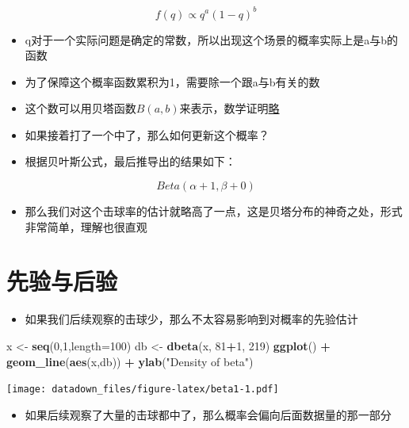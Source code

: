 \documentclass[]{book}
\newenvironment{Shaded}{\begin{snugshade}}{\end{snugshade}}
\newcommand{\DataTypeTok}[1]{\textcolor[rgb]{0.13,0.29,0.53}{#1}}
\newcommand{\DecValTok}[1]{\textcolor[rgb]{0.00,0.00,0.81}{#1}}
\newcommand{\KeywordTok}[1]{\textcolor[rgb]{0.13,0.29,0.53}{\textbf{#1}}}
\newcommand{\NormalTok}[1]{#1}
\newcommand{\OperatorTok}[1]{\textcolor[rgb]{0.81,0.36,0.00}{\textbf{#1}}}
\newcommand{\StringTok}[1]{\textcolor[rgb]{0.31,0.60,0.02}{#1}}
\providecommand{\tightlist}{%
  \setlength{\itemsep}{0pt}\setlength{\parskip}{0pt}}
\begin{document}
\[f(q) \propto q^a(1-q)^b\]

\begin{itemize}
\tightlist
\item
  q对于一个实际问题是确定的常数，所以出现这个场景的概率实际上是a与b的函数
\item
  为了保障这个概率函数累积为1，需要除一个跟a与b有关的数
\item
  这个数可以用贝塔函数\(B(a,b)\)来表示，数学证明\href{https://en.wikipedia.org/wiki/Conjugate_prior\#Example}{略}
\item
  如果接着打了一个中了，那么如何更新这个概率？
\item
  根据贝叶斯公式，最后推导出的结果如下：
\end{itemize}

\[Beta(\alpha+1,\beta+0)\]

\begin{itemize}
\tightlist
\item
  那么我们对这个击球率的估计就略高了一点，这是贝塔分布的神奇之处，形式非常简单，理解也很直观
\end{itemize}

\section{先验与后验}

\begin{itemize}
\tightlist
\item
  如果我们后续观察的击球少，那么不太容易影响到对概率的先验估计
\end{itemize}

\begin{Shaded}
\begin{Highlighting}[]
\NormalTok{x <-}\StringTok{ }\KeywordTok{seq}\NormalTok{(}\DecValTok{0}\NormalTok{,}\DecValTok{1}\NormalTok{,}\DataTypeTok{length=}\DecValTok{100}\NormalTok{)}
\NormalTok{db <-}\StringTok{ }\KeywordTok{dbeta}\NormalTok{(x, }\DecValTok{81}\OperatorTok{+}\DecValTok{1}\NormalTok{, }\DecValTok{219}\NormalTok{)}
\KeywordTok{ggplot}\NormalTok{() }\OperatorTok{+}\StringTok{ }\KeywordTok{geom_line}\NormalTok{(}\KeywordTok{aes}\NormalTok{(x,db)) }\OperatorTok{+}\StringTok{ }\KeywordTok{ylab}\NormalTok{(}\StringTok{"Density of beta"}\NormalTok{)}
\end{Highlighting}
\end{Shaded}

\texttt{[image: datadown\_files/figure-latex/beta1-1.pdf]}

\begin{itemize}
\tightlist
\item
  如果后续观察了大量的击球都中了，那么概率会偏向后面数据量的那一部分
\end{itemize}
\end{document}
